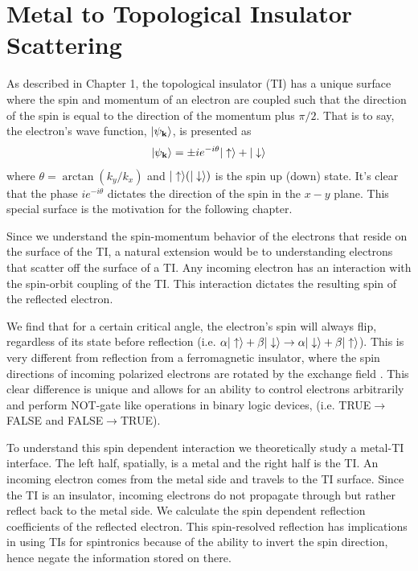 

\chapter{Metal to Topological Insulator Scattering}

As described in Chapter 1, the topological insulator (TI) has a unique surface where the spin and momentum of an electron are coupled such that the direction of the spin is equal to the direction of the momentum plus $\pi/2$. That is to say, the electron's wave function, $\vert \psi_{\bf{k}} \rangle$, is presented as
\begin{equation}
\vert \psi_{\bf{k}} \rangle=\pm i e^{-i \theta}\vert \uparrow \rangle+\vert \downarrow \rangle
\end{equation}
where $\theta=\arctan\left(k_y/k_x\right)$ and $\vert \uparrow \rangle (\vert \downarrow \rangle)$ is the spin up (down) state. It's clear that the phase $i e^{-i \theta}$ dictates the direction of the spin in the $x-y$ plane. 
This special surface is the motivation for the following chapter. 

Since we understand the spin-momentum behavior of the electrons that reside on the surface of the TI, a natural extension would be to understanding electrons that scatter off the surface of a TI. Any incoming electron has an interaction with the spin-orbit coupling of the TI. This interaction dictates the resulting spin of the reflected electron. 

We find that for a certain critical angle, the electron's spin will always flip, regardless of its state before reflection (i.e. $\alpha\vert \uparrow \rangle+\beta\vert \downarrow \rangle\rightarrow\alpha\vert \downarrow \rangle+\beta\vert \uparrow \rangle$). This is very different from reflection from a ferromagnetic insulator, where the spin directions of incoming polarized electrons are rotated by the exchange field \cite{toku}. This clear difference is unique and allows for an ability to control electrons arbitrarily and perform NOT-gate like operations in binary logic devices, (i.e. TRUE$\rightarrow$FALSE and FALSE$\rightarrow$TRUE). 

To understand this spin dependent interaction we theoretically study a metal-TI interface. The left half, spatially, is a metal and the right half is the TI. An incoming electron comes from the metal side and travels to the TI surface. Since the TI is an insulator, incoming electrons do not propagate through but rather reflect back to the metal side. We calculate the spin dependent reflection coefficients of the reflected electron. This spin-resolved reflection has implications in using TIs for spintronics because of the ability to invert the spin direction, hence negate the information stored on there.


